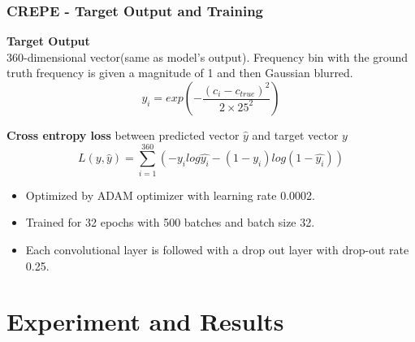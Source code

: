 \documentclass{beamer}
\begin{document}
\begin{frame}
\frametitle{CREPE - Target Output and Training}
\textbf{Target Output}\\
360-dimensional vector(same as model's output). Frequency bin with the ground truth frequency is given a magnitude of 1 and then Gaussian blurred.
\begin{equation}
    y_i = exp(-\frac{(c_i-c_{true})^2}{2\times25^2})
\end{equation}

\textbf{Cross entropy loss} between predicted vector $\hat{y}$ and target vector $y$\\
\begin{equation}
    L(y, \hat{y}) = \sum_{i=1}^{360}(-y_i log\hat{y_i}-(1-y_i) log(1-\hat{y_i}))
\end{equation}
\begin{itemize}
\item Optimized by ADAM optimizer with learning rate 0.0002.\\
\item Trained for 32 epochs with 500 batches and batch size 32.\\
\item Each convolutional layer is followed with a drop out layer with drop-out rate 0.25.
\end{itemize}
\end{frame}

\section{Experiment and Results}
\end{document}
